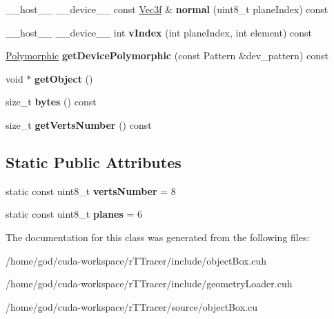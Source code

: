 \begin{DoxyCompactItemize}
\item 
\+\_\+\+\_\+host\+\_\+\+\_\+ \+\_\+\+\_\+device\+\_\+\+\_\+ const \hyperlink{class_vec3}{Vec3f} \& {\bfseries normal} (uint8\+\_\+t plane\+Index) const\hypertarget{class_cube_aaff58267b0dcda266d9ef4ca620bb580}{}\label{class_cube_aaff58267b0dcda266d9ef4ca620bb580}

\item 
\+\_\+\+\_\+host\+\_\+\+\_\+ \+\_\+\+\_\+device\+\_\+\+\_\+ int {\bfseries v\+Index} (int plane\+Index, int element) const\hypertarget{class_cube_a5bb5ee3421c5f40ff5c71a849b0777bf}{}\label{class_cube_a5bb5ee3421c5f40ff5c71a849b0777bf}

\item 
\hyperlink{struct_polymorphic}{Polymorphic} {\bfseries get\+Device\+Polymorphic} (const Pattern \&dev\+\_\+pattern) const\hypertarget{class_cube_a91b7f2d2323140cfedbd92c61b636e56}{}\label{class_cube_a91b7f2d2323140cfedbd92c61b636e56}

\item 
void $\ast$ {\bfseries get\+Object} ()\hypertarget{class_cube_abc09a66095f46d824a78cca265e25ed5}{}\label{class_cube_abc09a66095f46d824a78cca265e25ed5}

\item 
size\+\_\+t {\bfseries bytes} () const\hypertarget{class_cube_a6dd4277f8d5956f74d73bb1ef988ae3a}{}\label{class_cube_a6dd4277f8d5956f74d73bb1ef988ae3a}

\item 
size\+\_\+t {\bfseries get\+Verts\+Number} () const\hypertarget{class_cube_a5cc25a88ab64cccb175db6f91241d92e}{}\label{class_cube_a5cc25a88ab64cccb175db6f91241d92e}

\end{DoxyCompactItemize}
\subsection*{Static Public Attributes}
\begin{DoxyCompactItemize}
\item 
static const uint8\+\_\+t {\bfseries verts\+Number} = 8\hypertarget{class_cube_a3b7080965552fbd2cae0bb0c3951de87}{}\label{class_cube_a3b7080965552fbd2cae0bb0c3951de87}

\item 
static const uint8\+\_\+t {\bfseries planes} = 6\hypertarget{class_cube_a0b3de7a2bec544a46c8d61e331637c6f}{}\label{class_cube_a0b3de7a2bec544a46c8d61e331637c6f}

\end{DoxyCompactItemize}


The documentation for this class was generated from the following files\+:\begin{DoxyCompactItemize}
\item 
/home/god/cuda-\/workspace/r\+T\+Tracer/include/object\+Box.\+cuh\item 
/home/god/cuda-\/workspace/r\+T\+Tracer/include/geometry\+Loader.\+cuh\item 
/home/god/cuda-\/workspace/r\+T\+Tracer/source/object\+Box.\+cu\end{DoxyCompactItemize}
